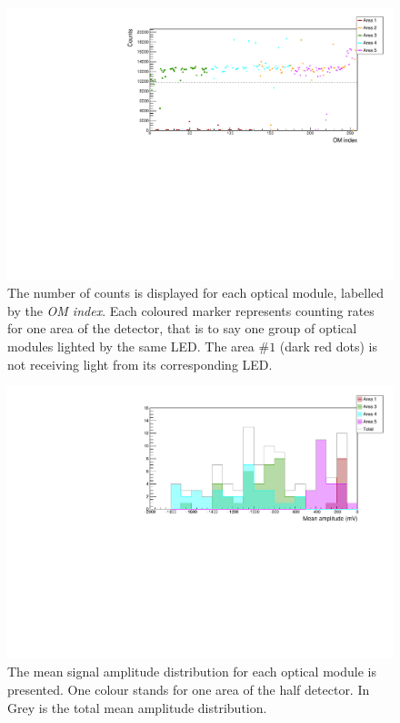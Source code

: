 \begin{figure}[h]
  \centering
  \includegraphics[width=15cm]{commissioning/fig_commissioning/LI_1d_counts.pdf}
  \caption{The number of counts is displayed for each optical module, labelled by the \emph{OM index}.
    Each coloured marker represents counting rates for one area of the detector, that is to say one group of optical modules lighted by the same LED.
    The area \#$1$ (dark red dots) is not receiving light from its corresponding LED.
    \label{fig:LI_counts}}
\end{figure}


\begin{figure}[h]
  \centering
  \includegraphics[width=15cm]{commissioning/fig_commissioning/LI_mean_ampl.pdf}
  \caption{The mean signal amplitude distribution for each optical module is presented.
    One colour stands for one area of the half detector.
    In Grey is the total mean amplitude distribution.
    \label{fig:LI_ampl}}
\end{figure}



